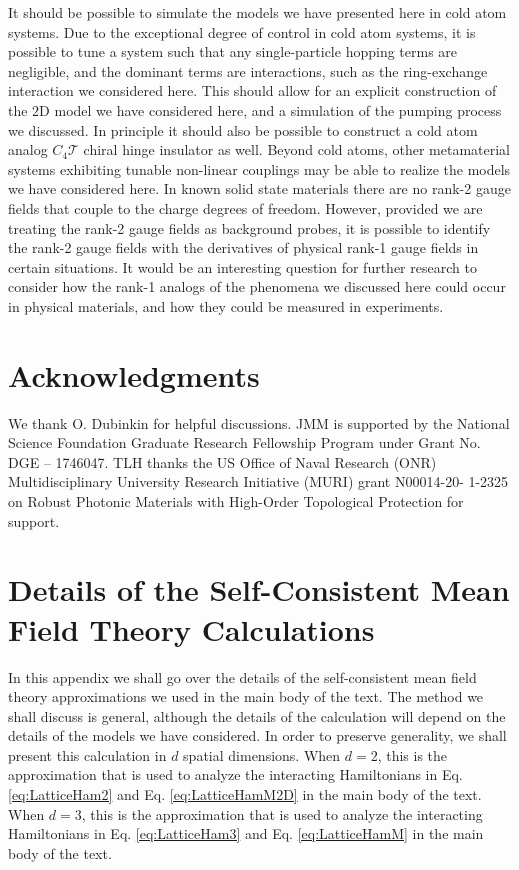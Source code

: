 \documentclass[prb,aps,twocolumn,groupaddress,floatfix]{revtex4-1}
\begin{document}
It should be possible to simulate the models we have presented here in cold atom systems. Due to the exceptional degree of control in cold atom systems, it is possible to tune a system such that any single-particle hopping terms are negligible, and the dominant terms are interactions, such as the ring-exchange interaction we considered here\cite{dai2016observation}. This should allow for an explicit construction of the $2$D model we have considered here, and a simulation of the pumping process we discussed. In principle it should also be possible to construct a cold atom analog $C_4\mathcal{T}$ chiral hinge insulator as well. Beyond cold atoms, other metamaterial systems exhibiting tunable non-linear couplings may be able to realize the models we have considered here. In known solid state materials there are no rank-2 gauge fields that couple to the charge degrees of freedom. However, provided we are treating the rank-2 gauge fields as background probes, it is possible to identify the rank-2 gauge fields with the derivatives of physical rank-1 gauge fields in certain situations\cite{dubinkin2019a}. It would be an interesting question for further research to consider how the rank-1 analogs of the phenomena we discussed here could occur in physical materials, and how they could be measured in experiments. 





\section*{Acknowledgments}
We thank O. Dubinkin for helpful discussions. JMM is supported by the National Science Foundation Graduate Research Fellowship Program under Grant No. DGE – 1746047. TLH thanks the US Office of Naval Research (ONR) Multidisciplinary University Research Initiative (MURI) grant
N00014-20- 1-2325 on Robust Photonic Materials with
High-Order Topological Protection for support. 





\appendix


\section{Details of the Self-Consistent Mean Field Theory Calculations} \label{app:selfCon}

In this appendix we shall go over the details of the self-consistent mean field theory approximations we used in the main body of the text. The method we shall discuss is general, although the details of the calculation will depend on the details of the models we have considered. In order to preserve generality, we shall present this calculation in $d$ spatial dimensions. When $d = 2$, this is the approximation that is used to analyze the interacting Hamiltonians in Eq. \ref{eq:LatticeHam2} and Eq. \ref{eq:LatticeHamM2D} in the main body of the text. When $d = 3$, this is the approximation that is used to analyze the interacting Hamiltonians in Eq. \ref{eq:LatticeHam3} and Eq. \ref{eq:LatticeHamM} in the main body of the text. 
\end{document}

